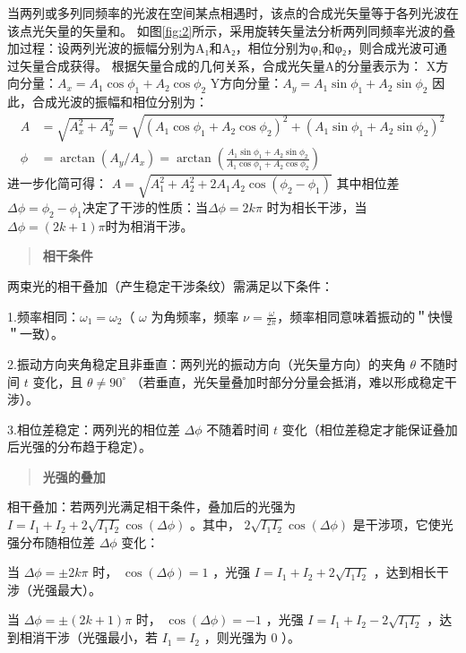 \documentclass[withoutpreface,bwprint]{cumcmthesis} %
\begin{document}
\begin{appendices}
    当两列或多列同频率的光波在空间某点相遇时，该点的合成光矢量等于各列光波在该点光矢量的矢量和。
    如图\ref{fig:2}所示，采用旋转矢量法分析两列同频率光波的叠加过程：设两列光波的振幅分别为A₁和A₂，相位分别为φ₁和φ₂，则合成光波可通过矢量合成获得。
    根据矢量合成的几何关系，合成光矢量A的分量表示为：
    X方向分量：$A_x=A_1 \cos\phi_1+A_2 \cos\phi_2$
    Y方向分量：$A_y=A_1 \sin\phi_1+A_2 \sin\phi_2$
    因此，合成光波的振幅和相位分别为：
    \begin{align*}
        A    & = \sqrt{A_x^2+A_y^2} = \sqrt{(A_1 \cos\phi_1+A_2 \cos\phi_2 )^2+(A_1 \sin\phi_1+A_2 \sin\phi_2 )^2}          \\
        \phi & = \arctan(A_y/A_x) = \arctan\left(\frac{A_1 \sin\phi_1+A_2 \sin\phi_2}{A_1 \cos\phi_1+A_2 \cos\phi_2}\right)
    \end{align*}
    进一步化简可得：
    $A=\sqrt{A_1^2+A_2^2+2A_1 A_2 \cos(\phi_2-\phi_1)}$
    其中相位差$\Delta\phi=\phi_2-\phi_1$决定了干涉的性质：当$\Delta\phi=2k\pi$ 时为相长干涉，当 $\Delta\phi=(2k+1)\pi$时为相消干涉。

    \begin{quote}
        \textbf{相干条件}
    \end{quote}
    两束光的相干叠加（产生稳定干涉条纹）需满足以下条件：

    1.频率相同：\(\omega_{1} = \omega_{2}\)（ $\omega$ 为角频率，频率 $\nu= \frac{\omega}{2\pi}$，频率相同意味着振动的＂快慢＂一致）。

    2.振动方向夹角稳定且非垂直：两列光的振动方向（光矢量方向）的夹角 $\theta$ 不随时间 $t$ 变化，且 $\theta \neq 90^\circ$ （若垂直，光矢量叠加时部分分量会抵消，难以形成稳定干涉）。

    3.相位差稳定：两列光的相位差 $\Delta \phi$ 不随着时间 $t$ 变化（相位差稳定才能保证叠加后光强的分布趋于稳定）。

    \begin{quote}
        \textbf{光强的叠加}
    \end{quote}

    相干叠加：若两列光满足相干条件，叠加后的光强为 $I = I_1 + I_2 + 2 \sqrt{I_1 I_2} \cos(\Delta \phi)$ 。其中， $2 \sqrt{I_1 I_2} \cos(\Delta \phi)$ 是干涉项，它使光强分布随相位差 $\Delta \phi$ 变化：

    当 $\Delta \phi = \pm 2k\pi$ 时， $\cos(\Delta \phi) = 1$ ，光强 $I = I_1 + I_2 + 2 \sqrt{I_1 I_2}$ ，达到相长干涉（光强最大）。

    当 $\Delta \phi = \pm (2k+1)\pi$ 时， $\cos(\Delta \phi) = -1$ ，光强 $I = I_1 + I_2 - 2 \sqrt{I_1 I_2}$ ，达到相消干涉（光强最小，若 $I_1 = I_2$ ，则光强为 $0$ ）。


\end{appendices}
\end{document}
